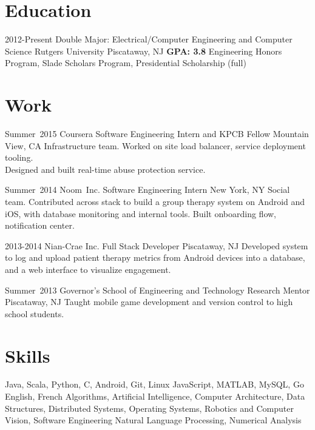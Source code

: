 \documentclass[11pt,letterpaper]{moderncv}
\begin{document}
\maketitle

\section{Education}
\cventry
    {2012-Present}
    {Double Major: Electrical/Computer Engineering and Computer Science}
    {\break Rutgers University}
    {Piscataway, NJ}
    {\textbf{GPA: 3.8}}
    {Engineering Honors Program, Slade Scholars Program, Presidential Scholarship (full)}

\section{Work}
    \cventry
        {Summer~2015}
        {Coursera}
        {Software Engineering Intern and KPCB Fellow}
        {Mountain View, CA}
        {}
        {Infrastructure team. Worked on site load balancer, service deployment tooling. \\Designed and built real-time abuse protection service. \\}

    \cventry
        {Summer~2014}
        {Noom~Inc.}
        {Software Engineering Intern}
        {New York, NY}
        {}
        {Social team. Contributed across stack to build a group therapy system on Android and iOS, with database monitoring and internal tools. Built onboarding flow, notification center.\\}

    \cventry
        {2013-2014}
        {Nian-Crae Inc.}
        {Full Stack Developer}
        {Piscataway, NJ}
        {}
        {Developed system to log and upload patient therapy metrics from Android devices into a database,\\and a web interface to visualize engagement.\\}

    \cventry
        {Summer~2013}
        {Governor's School of Engineering and Technology}
        {Research Mentor}
        {Piscataway, NJ}
        {}
        {Taught mobile game development and version control to high school students.}

\section{Skills}
       {Java, Scala, Python, C, Android, Git, Linux}
       {JavaScript, MATLAB, MySQL, Go}
       {English, French}
       {Algorithms, Artificial Intelligence, Computer Architecture, Data Structures, Distributed Systems, Operating Systems, Robotics and Computer Vision, Software Engineering}
       {Natural Language Processing, Numerical Analysis}
\end{document}
